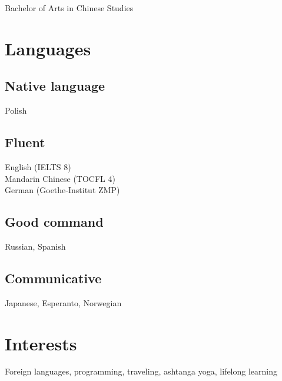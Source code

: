 \documentclass[10pt,a4paper]{article}
\begin{document}
\begin{minipage}[t]{0.3\textwidth}
  \small Bachelor of Arts in Chinese Studies
  
  \vspace{12pt}

  \section{Languages}

  \small
  \subsection{Native language} Polish \vspace{4pt}

  \subsection{Fluent}
  English (IELTS 8)\\ Mandarin Chinese (TOCFL 4)\\ German (Goethe-Institut ZMP) \vspace{4pt}

  \subsection{Good command}
  Russian, Spanish \vspace{4pt}

  \subsection{Communicative}
  Japanese, Esperanto, Norwegian

  \vspace{12pt}

  \section{Interests}

  \small Foreign languages, programming, traveling, ashtanga yoga, lifelong learning

\end{minipage}
\end{document}
